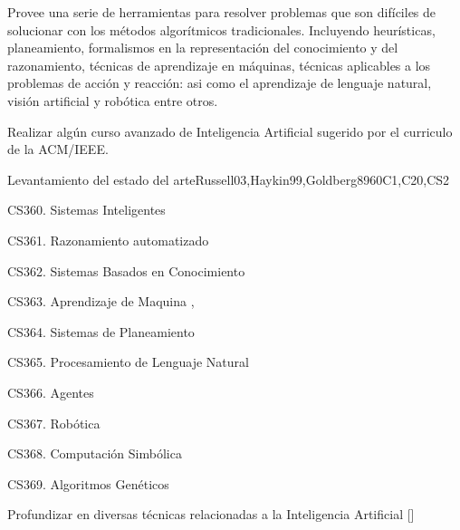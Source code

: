 \begin{syllabus}


\begin{justification}
Provee una serie de herramientas para resolver problemas que son difíciles de solucionar con los métodos algorítmicos tradicionales. Incluyendo heurísticas, planeamiento, formalismos en la representación del conocimiento y del razonamiento, técnicas de aprendizaje en máquinas, técnicas aplicables a los problemas de acción y reacción: asi como el aprendizaje de lenguaje natural, visión artificial y robótica entre otros. 
\end{justification}

\begin{goals}
\item Realizar algún curso avanzado de Inteligencia Artificial sugerido por el curriculo de la ACM/IEEE.
\end{goals}

\begin{outcomes}
\item {}
\item {}
\item {}
\item {}
\end{outcomes}

\begin{competences}
\item {} 
\item {} 
\item {}
\end{competences}

\begin{unit}{}{Levantamiento del estado del arte}{Russell03,Haykin99,Goldberg89}{60}{C1,C20,CS2}
\begin{topics}
      \item CS360. Sistemas Inteligentes
      \item CS361. Razonamiento automatizado
      \item CS362. Sistemas Basados en Conocimiento
      \item CS363. Aprendizaje de Maquina \cite{Russell03},\cite{Haykin99}
      \item CS364. Sistemas de Planeamiento
      \item CS365. Procesamiento de Lenguaje Natural
      \item CS366. Agentes
      \item CS367. Robótica
      \item CS368. Computación Simbólica
      \item CS369. Algoritmos Genéticos \cite{Goldberg89}
\end{topics}
\begin{learningoutcomes}
  \item Profundizar en diversas técnicas relacionadas a la Inteligencia Artificial [\Usage]
\end{learningoutcomes}
\end{unit}




\end{syllabus}

